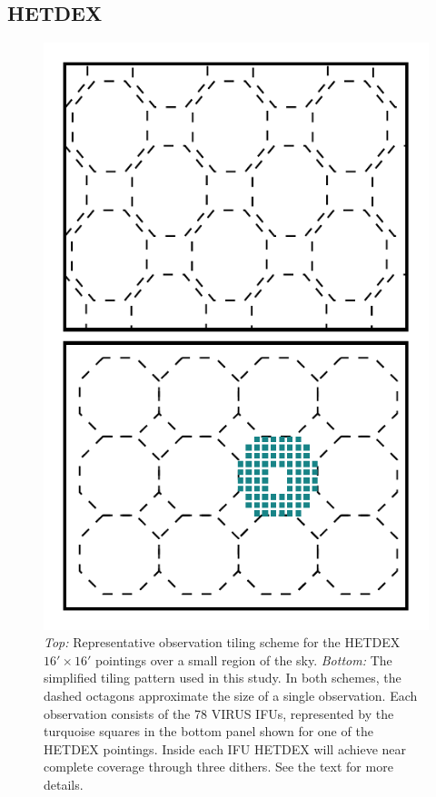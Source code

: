 \documentclass[fleqn,usenatbib]{mnras}
\begin{document}
\subsection{HETDEX}\label{sec: hetdex}
\begin{figure}
\includegraphics[width=\columnwidth]{figures/pointings.pdf} 
	\caption[HETDEX pointing strategy.]{\emph{Top:} Representative observation tiling scheme for the HETDEX $16' \times 16'$ pointings over a small region of the sky. \emph{Bottom:} The simplified tiling pattern used in this study. In both schemes, the dashed octagons approximate the size of a single observation. Each observation consists of the 78 VIRUS IFUs, represented by the turquoise squares in the bottom panel shown for one of the HETDEX pointings. Inside each IFU HETDEX will achieve near complete coverage through three dithers. See the text for more details.} 
	\label{fig: ifu layout} 
\end{figure}
\end{document}
